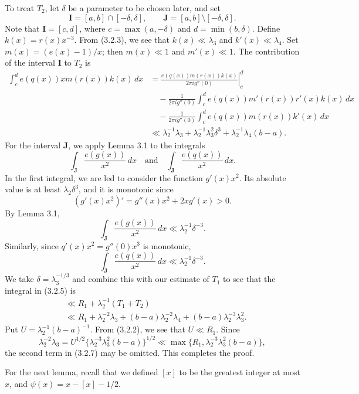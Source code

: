 \documentclass[10pt]{article}
\begin{document}
To treat $T_2$, let $\delta$ be a parameter to be chosen later, and set
\[
 \mathbf I=[a,b]\cap[-\delta,\delta],
 \qquad
 \mathbf J=[a,b]\setminus[-\delta,\delta].
\]
Note that $\mathbf I=[c,d]$, where $c=\max(a,-\delta)$ and
$d=\min(b,\delta)$. Define $k(x)=r(x)x^{-3}$. From (3.2.3), we see that
$k(x)\ll\lambda_3$ and $k'(x)\ll\lambda_4$. Set
$m(x)=(e(x)-1)/x$; then $m(x)\ll1$ and $m'(x)\ll1$. The contribution of the
interval $\mathbf I$ to $T_2$ is
\[
\begin{aligned}
 \int_c^d e(q(x))x m(r(x))k(x)\,dx
 &=\left.\frac{e(q(x))m(r(x))k(x)}{2\pi i g''(0)}\right|_c^d \\
 &\quad-\frac1{2\pi i g''(0)}\int_c^d e(q(x))m'(r(x))r'(x)k(x)\,dx \\
 &\quad-\frac1{2\pi i g''(0)}\int_c^d e(q(x))m(r(x))k'(x)\,dx \\
 &\ll \lambda_2^{-1}\lambda_3
 +\lambda_2^{-1}\lambda_3^2\delta^3
 +\lambda_2^{-1}\lambda_4(b-a).
\end{aligned}
\]
For the interval $\mathbf J$, we apply Lemma 3.1 to the integrals
\[
 \int_{\mathbf J}\frac{e(g(x))}{x^2}\,dx
 \quad\text{and}\quad
 \int_{\mathbf J}\frac{e(q(x))}{x^2}\,dx.
\]
In the first integral, we are led to consider the function $g'(x)x^2$. Its
absolute value is at least $\lambda_2\delta^3$, and it is monotonic since
\[
 (g'(x)x^2)'=g''(x)x^2+2xg'(x)>0.
\]
By Lemma 3.1,
\[
 \int_{\mathbf J}\frac{e(g(x))}{x^2}\,dx
 \ll\lambda_2^{-1}\delta^{-3}.
\]
Similarly, since $q'(x)x^2=g''(0)x^3$ is monotonic,
\[
 \int_{\mathbf J}\frac{e(q(x))}{x^2}\,dx
 \ll\lambda_2^{-1}\delta^{-3}.
\]
We take $\delta=\lambda_3^{-1/3}$ and combine this with our estimate of
$T_1$ to see that the integral in (3.2.5) is
\begin{equation*}
 \begin{aligned}
 &\ll R_1+\lambda_2^{-1}(T_1+T_2) \\
 &\ll R_1+\lambda_2^{-2}\lambda_3
 +(b-a)\lambda_2^{-2}\lambda_4
 +(b-a)\lambda_2^{-3}\lambda_3^2.
 \end{aligned} \tag{3.2.7}
\end{equation*}
Put $U=\lambda_2^{-1}(b-a)^{-1}$. From (3.2.2), we see that $U\ll R_1$.
Since
\[
 \lambda_2^{-2}\lambda_3
 =U^{1/2}\{\lambda_2^{-3}\lambda_3^2(b-a)\}^{1/2}
 \ll\max\{R_1,\lambda_2^{-3}\lambda_3^2(b-a)\},
\]
the second term in (3.2.7) may be omitted. This completes the proof.

For the next lemma, recall that we defined $[x]$ to be the greatest integer
at most $x$, and $\psi(x)=x-[x]-1/2$.
\end{document}
